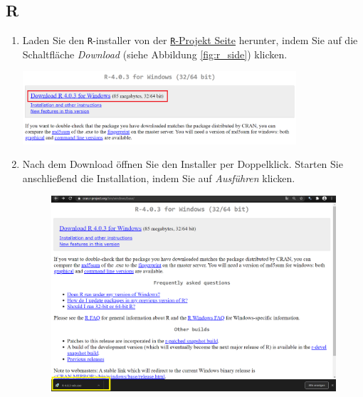 \documentclass[12pt,a4paper]{article}
\let\origfigure\figure
\let\endorigfigure\endfigure
\renewenvironment{figure}[1][2] {
    \expandafter\origfigure\expandafter[H]
} {
    \endorigfigure
}
\begin{document}
\hypertarget{r}{%
\subsection{R}\label{r}}

\begin{enumerate}
  \item Laden Sie den \texttt{R}-installer von der \href{https://cran.r-project.org/bin/windows/base/}{\texttt{R}-Projekt Seite} herunter, indem Sie auf die Schaltfläche \textit{Download} (siehe Abbildung \ref{fig:r_side}) klicken.
  \FloatBarrier
    \begin{figure}[h]
        \centering                      
        \includegraphics[width=0.8\textwidth]{images/r_projekt_side.PNG}
        \caption{R-Projektseite}
    \label{fig:r_side}
    \end{figure}
    \FloatBarrier
    \item Nach dem Download öffnen Sie den Installer per Doppelklick. Starten Sie anschließend die Installation, indem Sie auf \textit{Ausführen} klicken. 
    \begin{figure}
\centering
\begin{subfigure}{.5\textwidth}
  \centering
  \includegraphics[width=.95\linewidth]{images/overview.PNG}
  \label{fig:sub1}
\end{subfigure}%
\begin{subfigure}{.5\textwidth}

\end{subfigure}
\end{figure}
\end{enumerate}
\end{document}
